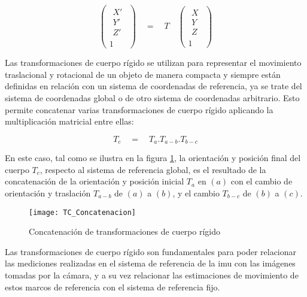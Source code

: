 \begin{equation}
\begin{pmatrix} \begin{matrix} X' \\ Y' \\ Z' \end{matrix} \\ 1 \end{pmatrix}\quad =\quad T\quad \begin{pmatrix} \begin{matrix} X \\ Y \\ Z \end{matrix} \\ 1 \end{pmatrix}
\end{equation}


Las transformaciones de cuerpo rígido se utilizan para representar el movimiento traslacional y rotacional de un objeto de manera compacta y siempre están definidas en relación con un sistema de coordenadas de referencia, ya se trate del sistema de coordenadas global o de otro sistema de coordenadas arbitrario. Esto permite concatenar varias transformaciones de cuerpo rígido aplicando la multiplicación matricial entre ellas:

\begin{equation}
{ T }_{ c }\quad =\quad { T }_{ a }{ .T }_{ a-b }.{ T }_{ b-c }
\end{equation}

En este caso, tal como se ilustra en la figura \ref{imagen:TC_Concatenacion}, la orientación y posición final del cuerpo ${T}_{c}$, respecto al sistema de referencia global, es el resultado de la concatenación de la orientación y posición inicial ${T}_{a}$ en $(a)$ con el cambio de orientación y traslación ${T}_{a-b}$  de $(a)$ a $(b)$, y el cambio ${T}_{b-c}$ de $(b)$ a $(c)$.


 \begin{figure}[H]
	\centering
	\texttt{[image: TC\_Concatenacion]}
	\caption[Concatenación de transformaciones de cuerpo rígido]{Concatenación de transformaciones de cuerpo rígido}
	\label{imagen:TC_Concatenacion}
\end{figure} 

Las transformaciones de cuerpo rígido son fundamentales para poder relacionar las mediciones realizadas en el sistema de referencia de la imu con las imágenes tomadas por la cámara, y a su vez relacionar las estimaciones de movimiento de estos marcos de referencia con el sistema de referencia fijo.\\


